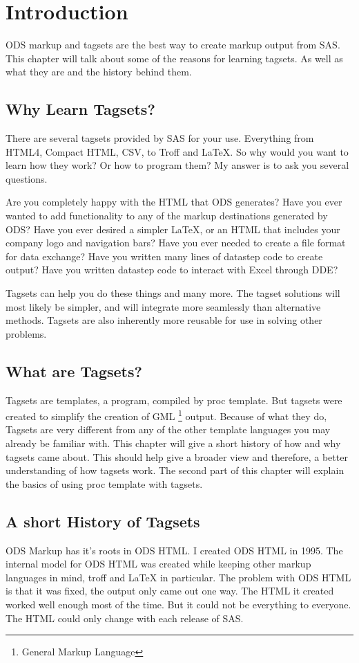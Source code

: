 \chapter{Introduction}
ODS markup and tagsets are the best way to create markup output
from SAS.  This chapter will talk about some of the reasons for
learning tagsets.  As well as what they are and the history 
behind them.

\section{Why Learn Tagsets?}
There are several tagsets provided by SAS for your use.  Everything
from HTML4, Compact HTML, CSV, to Troff and LaTeX. 
So why would you want to learn how they work?  Or how to program
them?  My answer is to ask you several questions.

Are you completely happy with the HTML that ODS generates?
Have you ever wanted to add functionality to any of the markup
destinations generated by ODS?  Have you ever desired a simpler 
LaTeX, or an HTML that includes your company logo and navigation bars?
Have you ever needed to create a file format for data exchange?
Have you written many lines of datastep code to create output?
Have you written datastep code to interact with Excel through DDE?

Tagsets can help you do these things and many more.  The tagset 
solutions will most likely be simpler, and will integrate more 
seamlessly than alternative methods.  Tagsets are also inherently 
more reusable for use in solving other problems.

\section{What are Tagsets?}
Tagsets are templates, a program, compiled by proc template.  
But tagsets were created to simplify the creation of GML
\footnote{General Markup Language} output.  Because of what they
do, Tagsets are very different from any of the other template 
languages you may already be familiar with.  This chapter will
give a short history of how and why tagsets came about.  This
should help give a broader view and therefore, a better understanding
of how tagsets work. The second part of this chapter will explain
the basics of using proc template with tagsets. 

\section{A short History of Tagsets}
ODS Markup has it's roots in ODS HTML.  I created ODS HTML in 1995.  The internal model 
for ODS HTML was created while keeping other markup languages in
mind, troff and LaTeX in particular.  
The problem with ODS HTML is that it was fixed, the output
only came out one way.  The HTML it created worked well enough most
of the time.  But it could not be everything to everyone.  The HTML
could only change with each release of SAS.  

